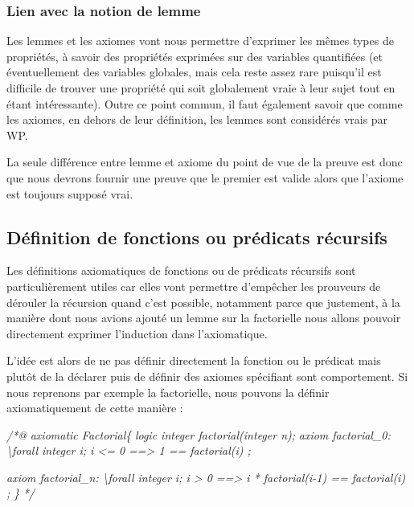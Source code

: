 \documentclass[12pt,francais,]{scrbook}
\newenvironment{Shaded}{}{}
\newcommand{\CommentTok}[1]{\textcolor[rgb]{0.38,0.63,0.69}{\textit{{#1}}}}
\begin{document}
\subsubsection{Lien avec la notion de
lemme}\label{lien-avec-la-notion-de-lemme}

Les lemmes et les axiomes vont nous permettre d'exprimer les mêmes types
de propriétés, à savoir des propriétés exprimées sur des variables
quantifiées (et éventuellement des variables globales, mais cela reste
assez rare puisqu'il est difficile de trouver une propriété qui soit
globalement vraie à leur sujet tout en étant intéressante). Outre ce
point commun, il faut également savoir que comme les axiomes, en dehors
de leur définition, les lemmes sont considérés vrais par WP.

La seule différence entre lemme et axiome du point de vue de la preuve
est donc que nous devrons fournir une preuve que le premier est valide
alors que l'axiome est toujours supposé vrai.

\subsection{Définition de fonctions ou prédicats
récursifs}\label{duxe9finition-de-fonctions-ou-pruxe9dicats-ruxe9cursifs}

Les définitions axiomatiques de fonctions ou de prédicats récursifs sont
particulièrement utiles car elles vont permettre d'empêcher les
prouveurs de dérouler la récursion quand c'est possible, notamment parce
que justement, à la manière dont nous avions ajouté un lemme sur la
factorielle nous allons pouvoir directement exprimer l'induction dans
l'axiomatique.

L'idée est alors de ne pas définir directement la fonction ou le
prédicat mais plutôt de la déclarer puis de définir des axiomes
spécifiant sont comportement. Si nous reprenons par exemple la
factorielle, nous pouvons la définir axiomatiquement de cette manière :

\begin{footnotesize}\begin{Shaded}
\begin{Highlighting}[]
\CommentTok{/*@}
\CommentTok{  axiomatic Factorial\{}
\CommentTok{    logic integer factorial(integer n);}
\CommentTok{    }
\CommentTok{    axiom factorial_0:}
\CommentTok{      \textbackslash{}forall integer i; i <= 0 ==> 1 == factorial(i) ;}

\CommentTok{    axiom factorial_n:}
\CommentTok{      \textbackslash{}forall integer i; i > 0 ==> i * factorial(i-1) == factorial(i) ;}
\CommentTok{  \}}
\CommentTok{*/}
\end{Highlighting}
\end{Shaded}\end{footnotesize}
\end{document}
